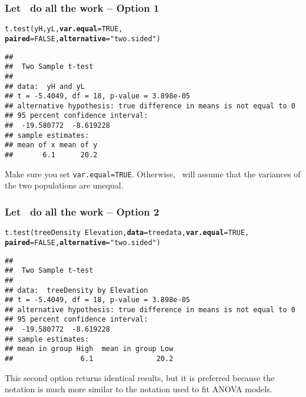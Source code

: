 \documentclass[color=usenames,dvipsnames]{beamer}\usepackage[]{graphicx}\usepackage[]{color}
\makeatletter
\newcommand{\hlnum}[1]{\textcolor[rgb]{0.69,0.494,0}{#1}}%
\newcommand{\hlstr}[1]{\textcolor[rgb]{0.749,0.012,0.012}{#1}}%
\newcommand{\hlopt}[1]{\textcolor[rgb]{0,0,0}{#1}}%
\newcommand{\hlstd}[1]{\textcolor[rgb]{0,0,0}{#1}}%
\newcommand{\hlkwc}[1]{\textcolor[rgb]{0,0,0}{\textbf{#1}}}%
\newcommand{\hlkwd}[1]{\textcolor[rgb]{0.004,0.004,0.506}{#1}}%
\newenvironment{kframe}{%
 \def\at@end@of@kframe{}%
 \ifinner\ifhmode%
  \def\at@end@of@kframe{\end{minipage}}%
  \begin{minipage}{\columnwidth}%
 \fi\fi%
 \def\FrameCommand##1{\hskip\@totalleftmargin \hskip-\fboxsep
 \colorbox{shadecolor}{##1}\hskip-\fboxsep
     \hskip-\linewidth \hskip-\@totalleftmargin \hskip\columnwidth}%
 \MakeFramed {\advance\hsize-\width
   \@totalleftmargin\z@ \linewidth\hsize
   \@setminipage}}%
 {\par\unskip\endMakeFramed%
 \at@end@of@kframe}
\newenvironment{knitrout}{}{} %
\newcommand{\inr}[1]{\colorbox{inlinecolor}{\texttt{#1}}}
\makeatother
\begin{document}
\begin{frame}[fragile]
  \frametitle{Let \R~do all the work -- Option 1}
  \footnotesize
\begin{knitrout}\scriptsize
{}\color{fgcolor}\begin{kframe}
\begin{alltt}
\hlkwd{t.test}\hlstd{(yH, yL,} \hlkwc{var.equal}\hlstd{=}\hlnum{TRUE}\hlstd{,}
       \hlkwc{paired}\hlstd{=}\hlnum{FALSE}\hlstd{,} \hlkwc{alternative}\hlstd{=}\hlstr{"two.sided"}\hlstd{)}
\end{alltt}
\begin{verbatim}
## 
## 	Two Sample t-test
## 
## data:  yH and yL
## t = -5.4049, df = 18, p-value = 3.898e-05
## alternative hypothesis: true difference in means is not equal to 0
## 95 percent confidence interval:
##  -19.580772  -8.619228
## sample estimates:
## mean of x mean of y 
##       6.1      20.2
\end{verbatim}
\end{kframe}
\end{knitrout}
\vfill
{\centering %
  Make sure you set \inr{var.equal=TRUE}. Otherwise, \R~will assume
  that the variances of the two populations are unequal. \\
}
\end{frame}



\begin{frame}[fragile]
  \frametitle{Let \R~do all the work -- Option 2}
  \footnotesize
\begin{knitrout}\scriptsize
{}\color{fgcolor}\begin{kframe}
\begin{alltt}
\hlkwd{t.test}\hlstd{(treeDensity} \hlopt{~} \hlstd{Elevation,} \hlkwc{data}\hlstd{=treedata,} \hlkwc{var.equal}\hlstd{=}\hlnum{TRUE}\hlstd{,}
       \hlkwc{paired}\hlstd{=}\hlnum{FALSE}\hlstd{,} \hlkwc{alternative}\hlstd{=}\hlstr{"two.sided"}\hlstd{)}
\end{alltt}
\begin{verbatim}
## 
## 	Two Sample t-test
## 
## data:  treeDensity by Elevation
## t = -5.4049, df = 18, p-value = 3.898e-05
## alternative hypothesis: true difference in means is not equal to 0
## 95 percent confidence interval:
##  -19.580772  -8.619228
## sample estimates:
## mean in group High  mean in group Low 
##                6.1               20.2
\end{verbatim}
\end{kframe}
\end{knitrout}
\vfill
{\centering %
  This second option returns identical results, but it is preferred
  because the notation is much more similar to the notation used to
  fit ANOVA models. \\
}
\end{frame}
\end{document}

